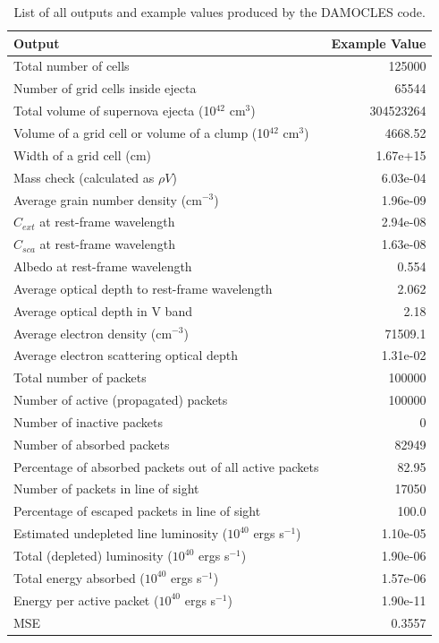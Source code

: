  \begin{table}
 \caption{List of all outputs and example values produced by the DAMOCLES code.}
 \begin{center}
 \def\arraystretch{1.5}
 \begin{tabular}{ l  r}
 \toprule
 Output & Example Value \\
 \midrule
 Total number of cells      & 125000 \\
 Number of grid cells inside ejecta   & 65544 \\
 Total volume of supernova ejecta (10$^{42}$ cm$^3$)   & 304523264 \\
 Volume of a grid cell or volume of a clump (10$^{42}$ cm$^3$)   & 4668.52\\
 Width of a grid cell (cm) &   1.67e+15\\
 \midrule
 Mass check (calculated as $\rho V$)   & 6.03e-04 \\
 \midrule
 Average grain number density (cm$^{-3}$)  & 1.96e-09\\
 $C_{ext}$ at rest-frame wavelength  & 2.94e-08 \\
 $C_{sca}$ at rest-frame wavelength  & 1.63e-08 \\
 Albedo at rest-frame wavelength & 0.554 \\
 Average optical depth to rest-frame wavelength  & 2.062 \\
 Average optical depth in V band  & 2.18 \\
 \midrule
 Average electron density (cm$^{-3}$) & 71509.1 \\
 Average electron scattering optical depth &   1.31e-02\\
 \midrule
 Total number of packets      &          100000\\
 Number of active (propagated) packets      &          100000\\
 Number of inactive packets        &            0\\
 Number of absorbed packets      &          82949   \\
 Percentage of absorbed packets out of all active packets & 82.95 \\
 Number of packets in line of sight  & 17050       \\
 Percentage of escaped packets in line of sight & 100.0 \\
 \midrule
 Estimated undepleted line luminosity ($10^{40}$ ergs s$^{-1}$)  & 1.10e-05\\
 Total (depleted) luminosity ($10^{40}$ ergs s$^{-1}$) & 1.90e-06\\
 Total energy absorbed ($10^{40}$ ergs s$^{-1}$) &  1.57e-06\\
 Energy per active packet ($10^{40}$ ergs s$^{-1}$) & 1.90e-11\\
 \midrule
 MSE	& 0.3557  \\
 \bottomrule
 \end{tabular}
 \end{center}
 \label{tb:outputs}
\end{table}%

